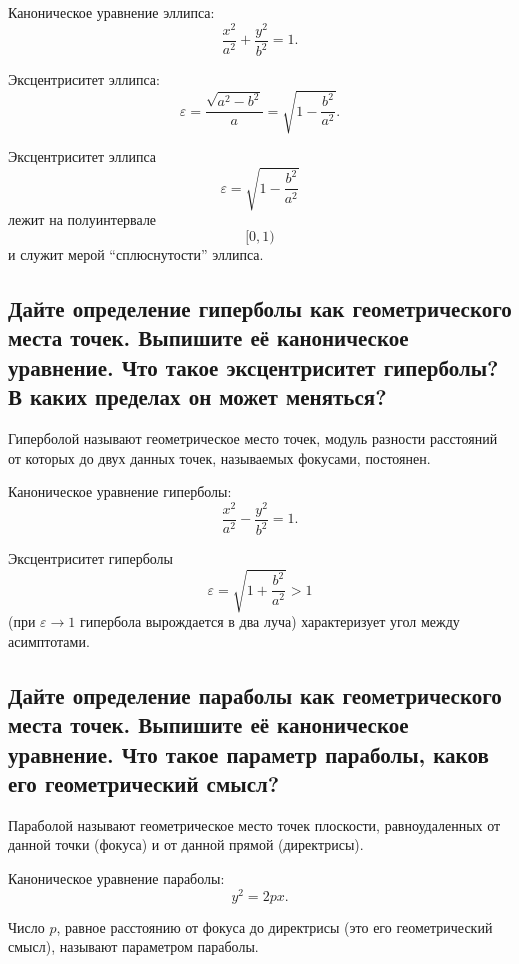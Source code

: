 \begin{remark}
    Каноническое уравнение эллипса:
    \[
        \frac{x^2}{a^2} + \frac{y^2}{b^2} = 1.
    \]
\end{remark}
\begin{definition}
    Эксцентриситет эллипса:
    \[
        \varepsilon
        =
        \frac{\sqrt{a^2-b^2}}{a}
        =
        \sqrt{1-\frac{b^2}{a^2}}.
    \]
\end{definition}
\begin{remark}
    Эксцентриситет эллипса
    \[
        \varepsilon
        =
        \sqrt{1-\frac{b^2}{a^2}}
    \]
    лежит на полуинтервале
    \[
        [0,1)
    \]
    и служит мерой ``сплюснутости'' эллипса.
\end{remark}


\subsection{Дайте определение гиперболы как геометрического места точек. Выпишите её каноническое уравнение. Что такое эксцентриситет гиперболы? В каких пределах он может меняться?}
\begin{definition}
    Гиперболой называют геометрическое место точек, модуль разности расстояний от которых до двух данных точек, называемых фокусами, постоянен.
\end{definition}

\begin{remark}
    Каноническое уравнение гиперболы:
    \[
        \frac{x^2}{a^2} - \frac{y^2}{b^2} = 1.
    \]

\end{remark}
\begin{remark}
    Эксцентриситет гиперболы
    \[
        \varepsilon
        =
        \sqrt{1+\frac{b^2}{a^2}}
        >
        1
    \]
    (при $\varepsilon \to 1$ гипербола вырождается в два луча) характеризует угол между асимптотами.
\end{remark}
\subsection{Дайте определение параболы как геометрического места точек. Выпишите её каноническое уравнение. Что такое параметр параболы, каков его геометрический смысл?}
\begin{definition}
    Параболой называют геометрическое место точек плоскости, равноудаленных от данной точки (фокуса) и от данной прямой (директрисы).
\end{definition}
\begin{remark}
    Каноническое уравнение параболы:
    \[
        y^2 = 2px.
    \]
\end{remark}
\begin{remark}
    Число $p$, равное расстоянию от фокуса до директрисы (это его геометрический смысл), называют параметром параболы.
\end{remark}

